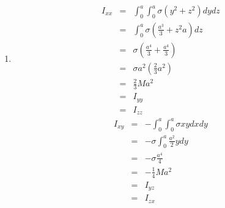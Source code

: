 \documentclass[a4paper,11pt,fleqn]{article}
\newcommand{\n}{\newline}
\begin{document}
\begin{enumerate}[start=12]
\item 
\begin{eqnarray*}
	I_{xx} &=& \int _0 ^a \int _0 ^a \sigma ( y^2 + z^2 ) dy dz \\
	&=& \int _0 ^a \sigma \left( \frac{a^3}{3} + z^2 a \right) dz \\
	&=& \sigma \left( \frac{a^4}{3} + \frac{a^4}{3} \right) \\
	&=& \sigma a^2 \left( \frac{2}{3} a^2 \right) \\
	&=& \frac{2}{3} M a^2 \\
	&=& I_{yy} \\
	&=& I_{zz}
\end{eqnarray*}
\begin{eqnarray*}
	I_{xy} &=& - \int _0 ^a \int _0 ^a \sigma xy dx dy \\
	&=& - \sigma \int _0 ^a \frac{a^2}{2} y dy \\
	&=& - \sigma \frac{a^4}{4} \\
	&=& - \frac{1}{4} M a^2 \\
	&=& I_{yz} \\
	&=& I_{zx}
\end{eqnarray*}
\n\n


\end{enumerate}
\end{document}
